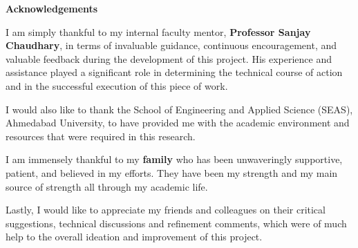 %
%
%

\thispagestyle{plain}
\begin{center}
{\fontsize{14}{16}\selectfont \textbf{Acknowledgements}}

\vspace{1cm}
\end{center}

\justifying
I am simply thankful to my internal faculty mentor, \textbf{Professor Sanjay Chaudhary}, in terms of invaluable guidance, continuous encouragement, and valuable feedback during the development of this project. His experience and assistance played a significant role in determining the technical course of action and in the successful execution of this piece of work.

\vspace{0.5cm}

I would also like to thank the School of Engineering and Applied Science (SEAS), Ahmedabad University, to have provided me with the academic environment and resources that were required in this research.

\vspace{0.5cm}

I am immensely thankful to my \textbf{family} who has been unwaveringly supportive, patient, and believed in my efforts. They have been my strength and my main source of strength all through my academic life.

\vspace{0.5cm}

Lastly, I would like to appreciate my friends and colleagues on their critical suggestions, technical discussions and refinement comments, which were of much help to the overall ideation and improvement of this project.
